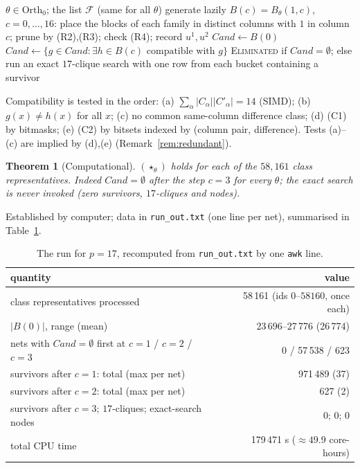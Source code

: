\documentclass[11pt,a4paper]{article}
\newtheorem{theorem}{Theorem}[section]
\theoremstyle{definition}
\newcommand{\Orth}{\mathrm{Orth}}
\begin{document}
\begin{algorithm}[ht]
\caption{Test of $(\star_\theta)$ for one representative $\theta$}\label{alg:main}
\begin{algorithmic}[1]
\Require $\theta\in\Orth_0$; the list $\mathcal F$ (same for all $\theta$)
\State generate lazily $B(c)=B_\theta(1,c)$, $c=0,\dots,16$: place the blocks of each family in distinct columns with $1$ in column $c$; prune by (R2),(R3); check (R4); record $u^1,u^2$
\State $\mathit{Cand}\gets B(0)$
  \State $\mathit{Cand}\gets\{g\in\mathit{Cand}:\exists h\in B(c)\text{ compatible with }g\}$ 
\EndFor
\State \Return \textsc{Eliminated} if $\mathit{Cand}=\emptyset$; else run an exact $17$-clique search with one row from each bucket containing a survivor
\end{algorithmic}
\end{algorithm}

Compatibility is tested in the order: (a) $\sum_\alpha|C_\alpha||C'_\alpha|=14$ (SIMD); (b) $g(x)\ne h(x)$ for all $x$; (c) no common same-column difference class; (d) (C1) by bitmasks; (e) (C2) by bitsets indexed by (column pair, difference). Tests (a)--(c) are implied by (d),(e) (Remark~\ref{rem:redundant}).

\begin{theorem}[Computational]\label{thm:comp}
$(\star_\theta)$ holds for each of the $58{,}161$ class representatives. Indeed $\mathit{Cand}=\emptyset$ after the step $c=3$ for every $\theta$; the exact search is never invoked (zero survivors, $17$-cliques and nodes).
\end{theorem}
\noindent Established by computer; data in \texttt{run\_out.txt} (one line per net), summarised in Table~\ref{tab:results}.

\begin{table}[ht]
\centering\small
\begin{tabular}{lr}
\toprule
quantity & value\\
\midrule
class representatives processed & 58\,161 (ids $0$--$58160$, once each)\\
$|B(0)|$, range (mean) & 23\,696--27\,776 (26\,774)\\
nets with $\mathit{Cand}=\emptyset$ first at $c=1$ / $c=2$ / $c=3$ & 0 / 57\,538 / 623\\
survivors after $c=1$: total (max per net) & 971\,489 (37)\\
survivors after $c=2$: total (max per net) & 627 (2)\\
survivors after $c=3$; $17$-cliques; exact-search nodes & 0; 0; 0\\
total CPU time & 179\,471 s ($\approx49.9$ core-hours)\\
\bottomrule
\end{tabular}
\caption{The run for $p=17$, recomputed from \texttt{run\_out.txt} by one \texttt{awk} line.}\label{tab:results}
\end{table}
\end{document}
